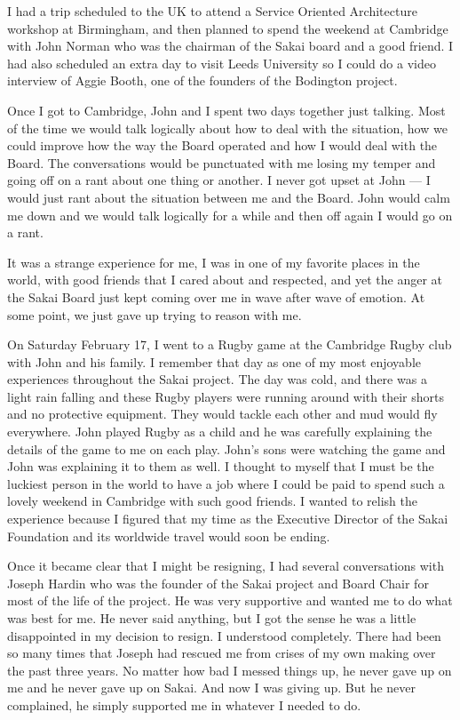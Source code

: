 \documentclass[12pt]{book}
\begin{document}
I had a trip scheduled to the UK to attend a Service Oriented Architecture workshop at
Birmingham, and then planned to spend the weekend at Cambridge with John Norman who
was the chairman of the Sakai board and a good friend.  I had also scheduled an extra day
to visit Leeds University so I could do a video interview of Aggie Booth,
one of the founders of the Bodington project.

Once I got to Cambridge, John and I spent two days together
just talking.  Most of the time we would
talk logically about how to deal with the situation,  how we could improve
how the way the Board operated and how I would deal with the Board.   The conversations
would be punctuated with me losing my temper and going off on a rant about
one thing or another.   I never got upset at John --- I would just rant about
the situation between me and the Board.  John would calm me down and we
would talk logically for a while and then off again I would go on a rant.

It was a strange experience for me, I was in one of my favorite places in the
world, with good friends that I cared about and respected, and yet the anger
at the Sakai Board just kept coming over me in wave after wave of emotion.
At some point, we just gave up trying to reason with me.

On Saturday February 17, I went to a Rugby game at the Cambridge Rugby club with
John and his family.  I remember that day as one of my most enjoyable experiences
throughout the Sakai project.  The day was cold, and there was a light rain falling
and these Rugby players were running around with their shorts and no protective
equipment.  They would tackle each other and mud would fly everywhere.  John played
Rugby as a child and he was carefully explaining the details of the game to
me on each play.  John's sons were watching the game and John was explaining it to them
as well.   I thought to myself that I must be the luckiest person in the world
to have a job where I could be paid to spend such a lovely weekend in Cambridge
with such good friends.   I wanted to relish the experience because I figured that
my time as the Executive Director of the Sakai Foundation and its worldwide travel
would soon be ending.

Once it became clear that I might be resigning, I had several conversations with
Joseph Hardin who was the founder of the Sakai project and Board Chair for most
of the life of the project.   He was very supportive and wanted me to do what
was best for me.  He never said anything, but I got the sense he was a little
disappointed in my decision to resign.   I understood completely.  There had been
so many times that Joseph had rescued me from crises of my own making over the
past three years.   No matter how bad I messed things up, he never gave up on me
and he never gave up on Sakai.  And now I was giving up.   But he never complained,
he simply supported me in whatever I needed to do.
\end{document}
